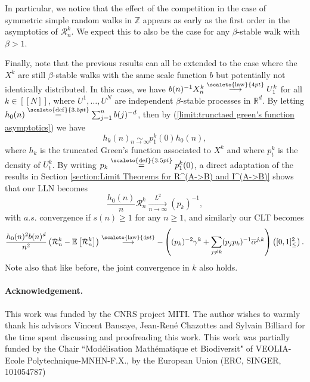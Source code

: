 \documentclass[12pt]{article}
\newcommand{\RR}{\mathbb R}
\newcommand{\R}{\mathcal R}
\newcommand{\EE}{\mathbb E}
\newcommand{\1}{\mathds{1}}
\newcommand{\ZZ}{\mathbb Z}
\newcommand{\distribution}{\stackrel{\scaleto{\mathrm{law}}{4pt}}{\longrightarrow}}
\newcommand{\eqdef}{\stackrel{\scaleto{\mathrm{def}}{3.5pt}}{=}}
\numberwithin{equation}{section}
\begin{document}
In particular, we notice that the effect of the competition in the case of symmetric simple random walks in $\ZZ$ appears as early as the first order in the asymptotics of $\R_n^k$. We expect this to also be the case for any $\beta$-stable walk with $\beta>1$.

Finally, note that the previous results can all be extended to the case where the $X^k$ are still $\beta$-stable walks with the same scale function $b$ but potentially not identically distributed. In this case, we have $b(n)^{-1}X_n^k\distribution U_1^k$ for all $k\in[\![N]\!]$, where $U^1,\dots,U^N$ are independent $\beta$-stable processes in $\RR^d$. By letting $h_0(n)\eqdef\sum_{j=1}^n b(j)^{-d}$, then by (\ref{limit:trunctaed green's function asymptotics}) we have 
\begin{equation*}
    h_k(n)\underset{n\rightarrow\infty}\sim p_1^k(0)h_0(n),
\end{equation*}
where $h_k$ is the truncated Green's function associated to $X^k$ and where $p_t^k$ is the density of $U_t^k$. By writing $p_k\eqdef p_1^k(0)$, a direct adaptation of the results in Section \ref{section:Limit Theorems for R^(A->B) and I^(A->B)} shows that our LLN becomes 
\begin{equation*}
    \frac{h_0(n)}{n}\R_n^k\underset{n\rightarrow\infty}{\overset{L^2}\longrightarrow}(p_k)^{-1},
\end{equation*}
with $a.s.$ convergence if $s(n)\ge1$ for any $n\ge1$, and similarly our CLT becomes 
\begin{equation*}
    \label{convergence:CLT without iid}
    \frac{h_0(n)^2b(n)^d}{n^2}\left(\R_n^k-\EE\left[\R_n^k\right]\right)\distribution-\left((p_k)^{-2}\gamma^k+\sum_{j\ne k}(p_jp_k)^{-1}\overline\alpha^{j,k}\right)\left([0,1]_\le^2\right).
\end{equation*}
Note also that like before, the joint convergence in $k$ also holds.

\paragraph{Acknowledgement.} This work was funded by the CNRS project MITI. The author wishes to warmly thank his advisors Vincent Bansaye, Jean-René Chazottes and Sylvain Billiard for the time spent discussing and proofreading this work. This work  was partially funded by the Chair “Modélisation Mathématique et Biodiversit\'" of VEOLIA-Ecole Polytechnique-MNHN-F.X., by the European Union (ERC, SINGER, 101054787)

\printbibliography[title={Bibliography}]
\end{document}
